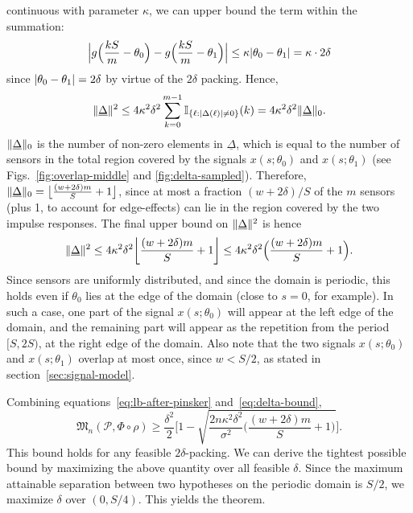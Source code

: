 \documentclass[conference]{IEEEtran}
\providecommand{\v}{}
\renewcommand{\v}[1]{\underline{#1}}
\DeclarePairedDelimiter\abs{\lvert}{\rvert}
\DeclarePairedDelimiter\norm{\lVert}{\rVert}
\DeclarePairedDelimiter\floor{\lfloor}{\rfloor}
\newcommand{\Phiorho}{\Phi\!\circ\!\rho}
\begin{document}
\begin{IEEEproof}
continuous with parameter $\kappa$, we can upper bound the term within the
summation:
\begin{equation}
	\abs[\Big]{g\Big(\frac{kS}{m} - \theta_0\Big) - g\Big(\frac{kS}{m} - \theta_1\Big)} \leq \kappa \abs{\theta_0 - \theta_1} = \kappa \cdot 2\delta
\end{equation}
since $\abs{\theta_0 - \theta_1} = 2\delta$ by virtue of the $2\delta$ packing.
Hence,
\begin{equation}
	\norm{\v\Delta}^2 \leq 4 \kappa^2 \delta^2 \sum_{k=0}^{m-1} \mathbb I_{\{\ell: \abs{\Delta(\ell)} \neq 0\}}(k) = 4 \kappa^2 \delta^2 \norm{\v\Delta}_0.
\end{equation}
$\norm{\v\Delta}_0$ is the number of non-zero elements in $\v\Delta$, which is
equal to the number of sensors in the total region covered by the signals
$x(s;\theta_0)$ and $x(s;\theta_1)$ (see Figs.~\ref{fig:overlap-middle} and
\ref{fig:delta-sampled}). Therefore, $\norm{\v\Delta}_0 = \floor[\big]{\frac{(w
+ 2\delta)m}{S} + 1}$, since at most a fraction $(w + 2\delta) / S$ of the $m$
sensors (plus 1, to account for edge-effects) can lie in the region covered by
the two impulse responses. The final upper bound on $\norm{\v\Delta}^2$ is
hence
\begin{equation} \label{eq:delta-bound}
	\norm{\v\Delta}^2 \leq 4 \kappa^2 \delta^2 \floor*{\frac{(w + 2\delta)m}{S} + 1} \leq 4 \kappa^2 \delta^2 \Big(\frac{(w + 2\delta) m}{S} + 1\Big).
\end{equation}
Since sensors are uniformly distributed, and since the domain is periodic, this
holds even if $\theta_0$ lies at the edge of the domain (close to $s=0$, for
example). In such a case, one part of the signal $x(s;\theta_0)$ will appear at
the left edge of the domain, and the remaining part will appear as the
repetition from the period $[S, 2S)$, at the right edge of the domain. Also
note that the two signals $x(s;\theta_0)$ and $x(s;\theta_1)$ overlap at most
once, since $w < S/2$, as stated in section~\ref{sec:signal-model}.

Combining equations~\eqref{eq:lb-after-pinsker} and~\eqref{eq:delta-bound},
\begin{equation} \label{eq:lb-after-delta-bound}
	\mathfrak{M}_n(\mathcal{P}, \Phiorho) \geq \frac{\delta^2}{2} \Bigg[1 - \sqrt{\frac{2n \kappa^2 \delta^2}{\sigma^2}\bigg(\!\frac{(w{+}2\delta) m}{S} + 1\!\bigg)} \Bigg].
\end{equation}
This bound holds for any feasible $2\delta$-packing. We can derive the tightest
possible bound by maximizing the above quantity over all feasible $\delta$.
Since the maximum attainable separation between two hypotheses on the periodic
domain is $S/2$, we maximize $\delta$ over $(0, S/4)$. This yields the theorem.


\end{IEEEproof}
\end{document}
